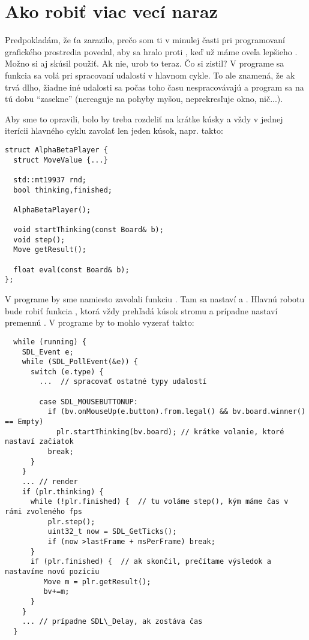 \chapter{Ako robiť viac vecí naraz}

Predpokladám, že ťa zarazilo, prečo som ti v minulej časti pri programovaní grafického prostredia povedal, aby sa hralo proti ,
keď už máme oveľa lepšieho . Možno si aj skúsil \hbox{} použiť. Ak nie, urob to teraz. Čo si zistil? 
V programe sa funkcia  sa volá pri spracovaní udalostí v hlavnom cykle. To ale znamená, že ak  trvá dlho, žiadne iné udalosti
sa počas toho času nespracovávajú a program sa na tú dobu ``zasekne'' (nereaguje na pohyby myšou, neprekresľuje okno, nič...). 

Aby sme to opravili, bolo by treba  rozdeliť na krátke kúsky a vždy v jednej iterícii hlavného cyklu zavolať len jeden kúsok, napr. takto:

\begin{lstlisting}
struct AlphaBetaPlayer {
  struct MoveValue {...}

  std::mt19937 rnd;
  bool thinking,finished;

  AlphaBetaPlayer();

  void startThinking(const Board& b);
  void step();
  Move getResult();

  float eval(const Board& b);
};
\end{lstlisting}

V programe by sme namiesto  zavolali funkciu . Tam sa nastaví  a . Hlavnú robotu bude robiť
funkcia , ktorá vždy prehľadá kúsok stromu a prípadne nastaví premennú . V programe by to mohlo vyzerať takto:

\begin{lstlisting}
  while (running) {
    SDL_Event e;
    while (SDL_PollEvent(&e)) {
      switch (e.type) {
        ...  // spracovať ostatné typy udalostí

        case SDL_MOUSEBUTTONUP:
          if (bv.onMouseUp(e.button).from.legal() && bv.board.winner() == Empty) 
            plr.startThinking(bv.board); // krátke volanie, ktoré nastaví začiatok
          break;
      }
    }
    ... // render
    if (plr.thinking) {
      while (!plr.finished) {  // tu voláme step(), kým máme čas v rámi zvoleného fps
          plr.step();
          uint32_t now = SDL_GetTicks();
          if (now >lastFrame + msPerFrame) break;
      }
      if (plr.finished) {  // ak skončil, prečítame výsledok a nastavíme novú pozíciu
         Move m = plr.getResult();
         bv+=m;
      }
    }
    ... // prípadne SDL\_Delay, ak zostáva čas
  }
\end{lstlisting}

